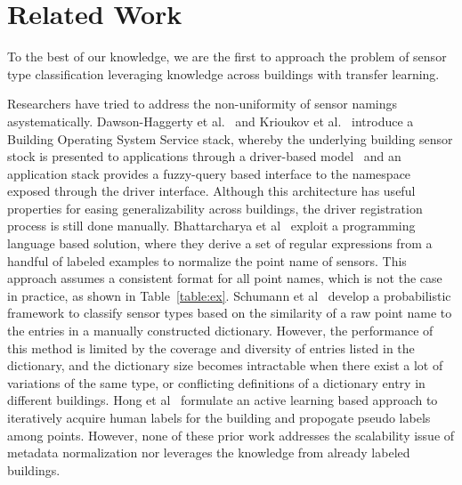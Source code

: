 \section{Related Work}
To the best of our knowledge, we are the first to approach the problem of sensor type classification leveraging knowledge across buildings with transfer learning.

Researchers have tried to address the non-uniformity of sensor namings asystematically.
Dawson-Haggerty et al.~\cite{boss} and Krioukov et al.~\cite{bas}
introduce a Building Operating System Service stack, whereby
the underlying building sensor stock is presented to applications through a driver-based model \
and an application stack provides a fuzzy-query based interface to the namespace exposed 
through the driver interface.
Although this architecture has useful properties for easing generalizability across
buildings, the driver registration process is still done manually. 
Bhattarcharya et al~\cite{arka} exploit a programming language based solution, 
where they derive a set of regular expressions from a handful of labeled examples 
to normalize the point name of sensors. 
This approach assumes a consistent format for all point names, which is not the case in practice, as shown in Table~\ref{table:ex}. 
Schumann et al~\cite{ibm} develop a probabilistic framework to classify sensor types 
based on the similarity of a raw point name to the entries in a manually constructed dictionary. 
However, the performance of this method is limited by the coverage and diversity of entries listed in the dictionary, and the dictionary size becomes intractable when there exist a lot of variations of the same type, or conflicting definitions of a dictionary entry in different buildings.
Hong et al~\cite{cikm} formulate an active learning based approach to iteratively 
acquire human labels for the building and propogate pseudo labels among points.
However, none of these prior work addresses the scalability issue of metadata 
normalization nor leverages the knowledge from already labeled buildings.

